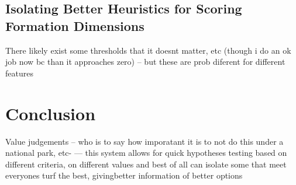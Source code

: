 \documentclass[letterpaper, 12pt]{article}
\begin{document}
\subsection{Isolating Better Heuristics for Scoring Formation Dimensions}
There likely exist some thresholds that it doesnt matter, etc (though i do an ok job now bc than it approaches zero) -- but these are prob diferent for different features
\section{Conclusion}



Value judgements -- who is to say how imporatant it is to not do this under a national park, etc- --- this system allows for quick hypotheses testing based on different criteria, on different values and best of all can isolate some that meet everyones turf the best, givingbetter information of better options 
 
\end{document}
